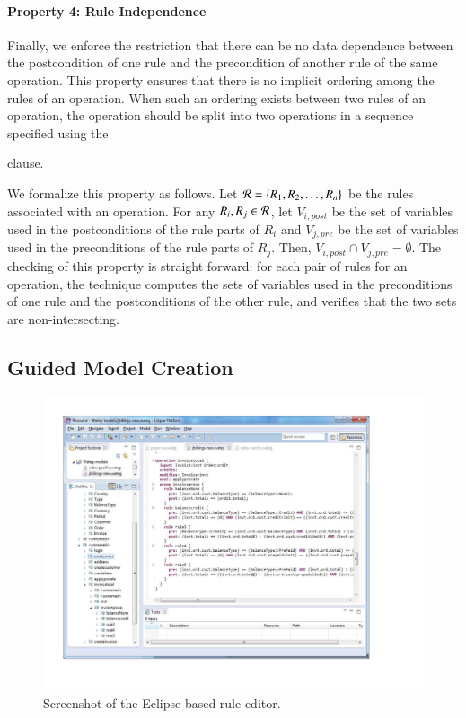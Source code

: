 \paragraph*{Property 4: Rule Independence}
Finally, we enforce the restriction that there can be no data dependence between
the postcondition of one rule and the precondition of another rule of the same
operation. This property ensures that there is no implicit ordering among the
rules of an operation. When such an ordering exists between two rules of an
operation, the operation should be split into two operations in a sequence
specified using the \subject{next} clause.

We formalize this property as follows. Let ${\cal R} = \{R_1, R_2, \ldots,
R_n\}$ be the rules associated with an operation. For any $R_i, R_j \in {\cal
  R}$, let $V_{i, \mathit{post}}$ be the set of variables used in the
postconditions of the rule parts of $R_i$ and $V_{j, \mathit{pre}}$ be the set
of variables used in the preconditions of the rule parts of $R_j$. Then, $V_{i,
  \mathit{post}} \cap V_{j, \mathit{pre}} = \emptyset$. The checking of this
property is straight forward: for each pair of rules for an operation, the
technique computes the sets of variables used in the preconditions of one rule
and the postconditions of the other rule, and verifies that the two sets are
non-intersecting.

\subsection{Guided Model Creation}

\begin{figure}[t]
\centering
\includegraphics[trim=43 65 114 36,clip,width=.9\columnwidth]{figs/rule-editor.pdf}
\vspace*{-13pt}
\caption{Screenshot of the Eclipse-based rule editor.}
\vspace*{-0pt}
\label{fig:rule-editor}
\end{figure}

